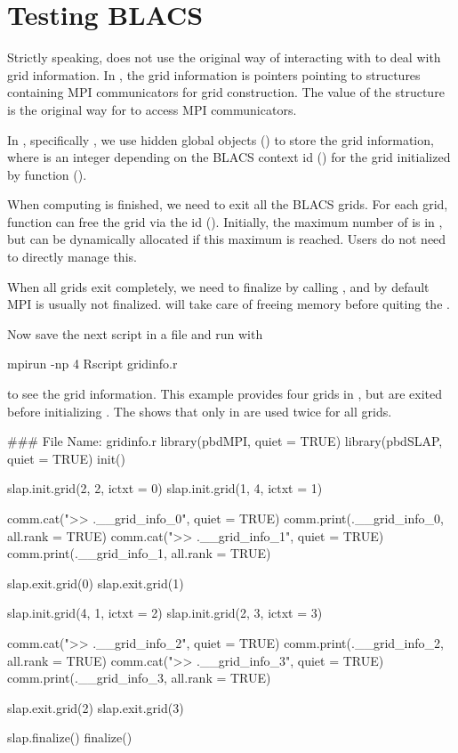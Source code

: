 
\section[Testing BLACS]{Testing BLACS}
\label{sec:blacs}

Strictly speaking,  does not use the original way of interacting with  to
deal with grid information. In , the grid information
is pointers pointing to  structures containing
MPI communicators for grid construction.
The  value of the  structure is the original way for
 to access MPI communicators.

In , specifically , we use hidden global  objects ()
to store the grid information, where \code{*} is an integer depending on the BLACS context id () for the grid initialized by function ().

When computing is finished, we need to exit all the BLACS grids.
For each grid,  function can free the grid
via the id ().
Initially, the maximum number of  is  in ,
but can be dynamically allocated if this maximum is reached. Users do not need to directly manage this.

When all grids exit completely, we need to finalize  by
calling , and by default MPI is usually not finalized.
 will take care of freeing memory before quiting
the .

Now save the next script in a file and run with
\begin{Command}
mpirun -np 4 Rscript gridinfo.r
\end{Command}
to see the grid information. 
This example provides four grids  in ,
but  are exited before initializing . The 
shows that only  in 
are used twice for all grids.
\begin{Code}[title=SPMD R Script]
### File Name: gridinfo.r
library(pbdMPI, quiet = TRUE)
library(pbdSLAP, quiet = TRUE)
init()

slap.init.grid(2, 2, ictxt = 0)
slap.init.grid(1, 4, ictxt = 1)

comm.cat(">> .__grid_info_0\n", quiet = TRUE)
comm.print(.__grid_info_0, all.rank = TRUE)
comm.cat(">> .__grid_info_1\n", quiet = TRUE)
comm.print(.__grid_info_1, all.rank = TRUE)

slap.exit.grid(0)
slap.exit.grid(1)

slap.init.grid(4, 1, ictxt = 2)
slap.init.grid(2, 3, ictxt = 3)

comm.cat(">> .__grid_info_2\n", quiet = TRUE)
comm.print(.__grid_info_2, all.rank = TRUE)
comm.cat(">> .__grid_info_3\n", quiet = TRUE)
comm.print(.__grid_info_3, all.rank = TRUE)

slap.exit.grid(2)
slap.exit.grid(3)

slap.finalize()
finalize()
\end{Code}

